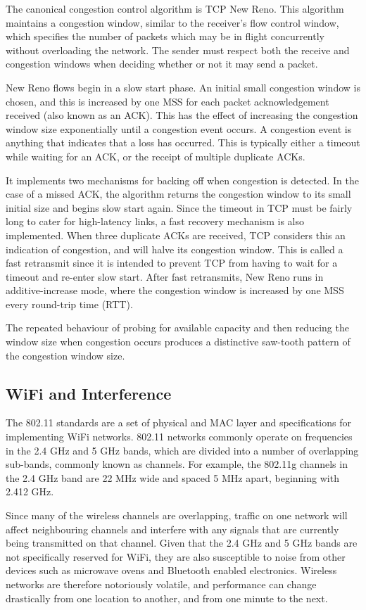 The canonical congestion control algorithm is TCP New Reno. This algorithm
maintains a congestion window, similar to the receiver's flow control window,
which specifies the number of packets which may be in flight concurrently
without overloading the network. The sender must respect both the receive and
congestion windows when deciding whether or not it may send a packet.

New Reno flows begin in a slow start phase. An initial small congestion window
is chosen, and this is increased by one MSS for each packet acknowledgement
received (also known as an ACK). This has the effect of increasing the
congestion window size exponentially until a congestion event occurs. A
congestion event is anything that indicates that a loss has occurred.  This is
typically either a timeout while waiting for an ACK, or the receipt of multiple
duplicate ACKs.

It implements two mechanisms for backing off when congestion is detected. In the
case of a missed ACK, the algorithm returns the congestion window to its small
initial size and begins slow start again. Since the timeout in TCP must be
fairly long to cater for high-latency links, a fast recovery mechanism is also
implemented. When three duplicate ACKs are received, TCP considers this an
indication of congestion, and will halve its congestion window. This is called a
fast retransmit since it is intended to prevent TCP from having to wait for a
timeout and re-enter slow start. After fast retransmits, New Reno runs in
additive-increase mode, where the congestion window is increased by one MSS
every round-trip time (RTT).

The repeated behaviour of probing for available capacity and then reducing the
window size when congestion occurs produces a distinctive saw-tooth pattern of
the congestion window size.

\subsection{WiFi and Interference}
\label{sec:bg:wifi}
The 802.11 standards are a set of physical and MAC layer and specifications for
implementing WiFi networks. 802.11 networks commonly operate on frequencies in
the 2.4 GHz and 5 GHz bands, which are divided into a number of overlapping
sub-bands, commonly known as channels. For example, the 802.11g channels in
the 2.4 GHz band are 22 MHz wide and spaced 5 MHz apart, beginning with 2.412
GHz.

Since many of the wireless channels are overlapping, traffic on one network will
affect neighbouring channels and interfere with any signals that are currently
being transmitted on that channel. Given that the 2.4 GHz and 5 GHz bands are
not specifically reserved for WiFi, they are also susceptible to noise from
other devices such as microwave ovens and Bluetooth enabled electronics.
Wireless networks are therefore notoriously volatile, and performance can change
drastically from one location to another, and from one minute to the next.

